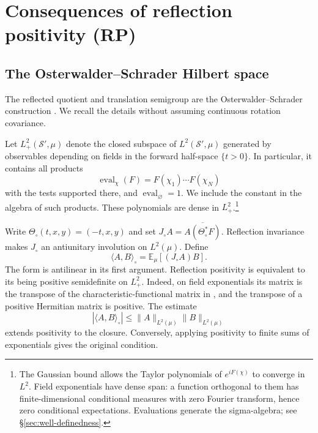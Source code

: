 \documentclass[11pt, letterpaper, reqno]{amsart}
\theoremstyle{definition}
\theoremstyle{remark}
\newcommand{\bbE}{\mathbb{E}}
\newcommand{\calS}{\mathcal{S}}
\begin{document}
\section{Consequences of reflection positivity (RP)}\label{sec:RP}

\subsection{The Osterwalder--Schrader Hilbert space}

The reflected quotient and translation semigroup are the
Osterwalder--Schrader construction \cite{OS,OS2}. We recall the details
without assuming continuous rotation covariance.

Let $L^2_+(\calS',\mu)$ denote the closed subspace of $L^2(\calS',\mu)$
generated by observables depending on fields in the forward half-space
$\{t>0\}$. In particular, it contains all products
\begin{equation}
 \operatorname{eval}_\chi(F)=F(\chi_1)\cdots F(\chi_N)
\end{equation}
with the tests supported there, and $\operatorname{eval}_\varnothing=1$.
We include the constant in the algebra of such products.
These polynomials are dense in $L^2_+$.\footnote{The Gaussian bound
allows the Taylor polynomials of $e^{iF(\chi)}$ to converge in $L^2$.
Field exponentials have dense span: a function orthogonal to them has
finite-dimensional conditional measures with zero Fourier transform,
hence zero conditional expectations. Evaluations generate the
sigma-algebra; see \S\ref{sec:well-definedness}.}

Write $\Theta_\circ(t,x,y)=(-t,x,y)$ and set
$J_\circ A=\overline{A(\Theta_\circ^*F)}$. Reflection invariance makes
$J_\circ$ an antiunitary involution on $L^2(\mu)$. Define
\begin{equation}\label{eq:OS-form}
 \langle A,B\rangle_\circ=\bbE_\mu[(J_\circ A)B].
\end{equation}
The form is antilinear in its first argument. Reflection positivity is
equivalent to its being positive semidefinite on $L^2_+$.
Indeed, on field exponentials its matrix is the transpose of the
characteristic-functional matrix in , and the transpose
of a positive Hermitian matrix is positive. The estimate
\begin{equation}\label{eq:class-contraction}
 |\langle A,B\rangle_\circ|\leq\|A\|_{L^2(\mu)}\|B\|_{L^2(\mu)}
\end{equation}
extends positivity to the closure. Conversely, applying positivity to
finite sums of exponentials gives the original condition.
\end{document}
